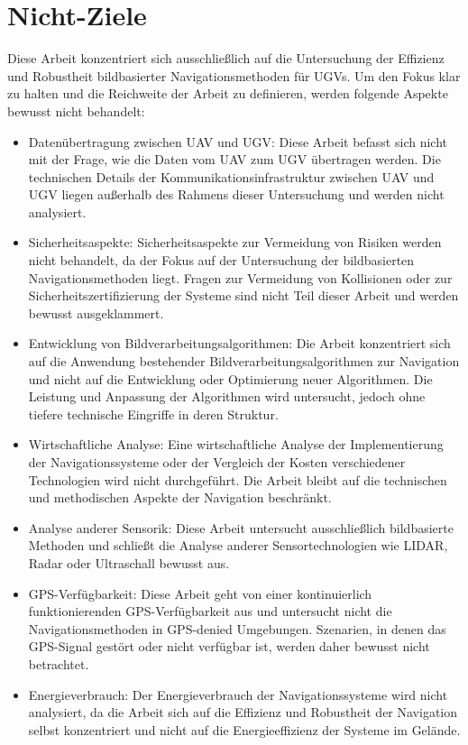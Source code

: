 \section{Nicht-Ziele}

Diese Arbeit konzentriert sich ausschließlich auf die Untersuchung der Effizienz und Robustheit bildbasierter Navigationsmethoden für \ac{UGV}s. 
Um den Fokus klar zu halten und die Reichweite der Arbeit zu definieren, werden folgende Aspekte bewusst nicht behandelt:

\begin{itemize}
  \item Datenübertragung zwischen \ac{UAV} und \ac{UGV}: 
    Diese Arbeit befasst sich nicht mit der Frage, wie die Daten vom \ac{UAV} zum \ac{UGV} übertragen werden. 
    Die technischen Details der Kommunikationsinfrastruktur zwischen \ac{UAV} und \ac{UGV} liegen außerhalb des Rahmens dieser Untersuchung und werden nicht analysiert.

  \item Sicherheitsaspekte: 
    Sicherheitsaspekte zur Vermeidung von Risiken werden nicht behandelt, da der Fokus auf der Untersuchung der bildbasierten Navigationsmethoden liegt. 
    Fragen zur Vermeidung von Kollisionen oder zur Sicherheitszertifizierung der Systeme sind nicht Teil dieser Arbeit und werden bewusst ausgeklammert.

  \item Entwicklung von Bildverarbeitungsalgorithmen: 
    Die Arbeit konzentriert sich auf die Anwendung bestehender Bildverarbeitungsalgorithmen zur Navigation und nicht auf die Entwicklung oder Optimierung neuer Algorithmen. 
    Die Leistung und Anpassung der Algorithmen wird untersucht, jedoch ohne tiefere technische Eingriffe in deren Struktur.

  \item Wirtschaftliche Analyse: 
    Eine wirtschaftliche Analyse der Implementierung der Navigationssysteme oder der Vergleich der Kosten verschiedener Technologien wird nicht durchgeführt. 
    Die Arbeit bleibt auf die technischen und methodischen Aspekte der Navigation beschränkt.

  \item Analyse anderer Sensorik: 
    Diese Arbeit untersucht ausschließlich bildbasierte Methoden und schließt die Analyse anderer Sensortechnologien wie \gls{LIDAR}, Radar oder Ultraschall bewusst aus.

  \item GPS-Verfügbarkeit: 
    Diese Arbeit geht von einer kontinuierlich funktionierenden \ac{GPS}-Verfügbarkeit aus und untersucht nicht die Navigationsmethoden in \gls{GPS-denied} Umgebungen. 
    Szenarien, in denen das \ac{GPS}-Signal gestört oder nicht verfügbar ist, werden daher bewusst nicht betrachtet.

  \item Energieverbrauch: 
    Der Energieverbrauch der Navigationssysteme wird nicht analysiert, da die Arbeit sich auf die Effizienz und Robustheit der Navigation selbst konzentriert und nicht auf die Energieeffizienz der Systeme im Gelände.
\end{itemize}

